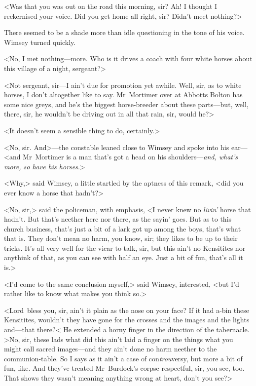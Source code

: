 <Was that you was out on the road this morning, sir? Ah! I thought I reckernised your voice. Did you get home all right, sir? Didn't meet nothing?>

There seemed to be a shade more than idle questioning in the tone of his voice. Wimsey turned quickly.

<No, I met nothing—more. Who is it drives a coach with four white horses about this village of a night, sergeant?>

<Not sergeant, sir—I ain't due for promotion yet awhile. Well, sir, as to white horses, I don't altogether like to say. Mr~Mortimer over at Abbotts Bolton has some nice greys, and he's the biggest horse-breeder about these parts—but, well, there, sir, he wouldn't be driving out in all that rain, sir, would he?>

<It doesn't seem a sensible thing to do, certainly.>

<No, sir. And>—the constable leaned close to Wimsey and spoke into his ear—<and Mr~Mortimer is a man that's got a head on his shoulders—\textit{and, what's more, so have his horses}.>

<Why,> said Wimsey, a little startled by the aptness of this remark, <did you ever know a horse that hadn't?>

<No, sir,> said the policeman, with emphasis, <I never knew no \textit{livin'} horse that hadn't. But that's neether here nor there, as the sayin' goes. But as to this church business, that's just a bit of a lark got up among the boys, that's what that is. They don't mean no harm, you know, sir; they likes to be up to their tricks. It's all very well for the vicar to talk, sir, but this ain't no Kensitites nor anythink of that, as you can see with half an eye. Just a bit of fun, that's all it is.>

<I'd come to the same conclusion myself,> said Wimsey, interested, <but I'd rather like to know what makes you think so.>

<Lord~bless you, sir, ain't it plain as the nose on your face? If it had a-bin these Kensitites, wouldn't they have gone for the crosses and the images and the lights and—that there?< He extended a horny finger in the direction of the tabernacle. >No, sir, these lads what did this ain't laid a finger on the things what you might call sacred images—and they ain't done no harm neether to the communion-table. So I says as it ain't a case of con\textit{trou}versy, but more a bit of fun, like. And they've treated Mr~Burdock's corpse respectful, sir, you see, too. That shows they wasn't meaning anything wrong at heart, don't you see?>

